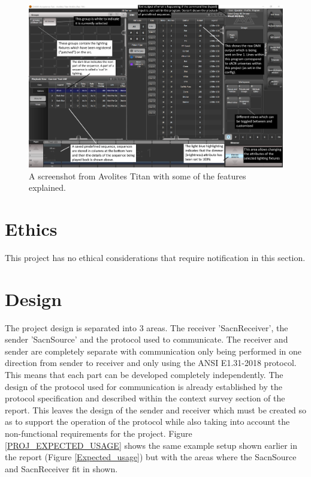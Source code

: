 \documentclass[11pt,a4paper]{article}
\begin{document}
\begin{figure}[H]
	\includegraphics[width=\textwidth]{avo_titan_explained}
	\caption{A screenshot from Avolites Titan with some of the features explained.}
	\label{AVO_EXPLAINED}
\end{figure}

\section{Ethics}
This project has no ethical considerations that require notification in this section.

\section{Design}
The project design is separated into 3 areas. The receiver 'SacnReceiver', the sender 'SacnSource' and the protocol used to communicate. The receiver and sender are completely separate with communication only being performed in one direction from sender to receiver and only using the ANSI E1.31-2018 protocol. This means that each part can be developed completely independently. The design of the protocol used for communication is already established by the protocol specification and described within the context survey section of the report. This leaves the design of the sender and receiver which must be created so as to support the operation of the protocol while also taking into account the non-functional requirements for the project. Figure \ref{PROJ_EXPECTED_USAGE} shows the same example setup shown earlier in the report (Figure \ref{Expected_usage}) but with the areas where the SacnSource and SacnReceiver fit in shown.
\end{document}
